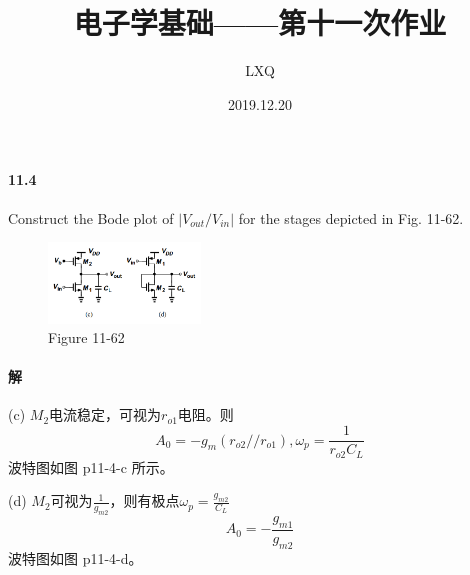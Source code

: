 \documentclass[hyperref, UTF8]{ctexart}
\title{电子学基础——第十一次作业}
\author{LXQ}
\date{2019.12.20}
\newcommand{\under}[1]{\frac{1}{#1}}
\begin{document}
\maketitle

\paragraph{11.4} \label{11.4}
    Construct the Bode plot of $|V_{out}/V_{in}|$ for the stages depicted in Fig. 11-62.

    \begin{figure}[!htb]
        \centering
        \includegraphics[width=0.362\textwidth]{p11-62.png}
        \caption*{Figure 11-62}
    \end{figure}

\paragraph{解}
    (c) $M_2$电流稳定，可视为$r_{o1}$电阻。则
    $$A_0 = -g_m(r_{o2}//r_{o1}), \omega_p = \under{r_{o2}C_L}$$
    波特图如图 p11-4-c 所示。

    (d) $M_2$可视为$\under{g_{m2}}$，则有极点$\omega_p = \frac{g_{m2}}{C_L}$
    $$A_0 = -\frac{g_{m1}}{g_{m2}}$$
    波特图如图 p11-4-d。
\end{document}
